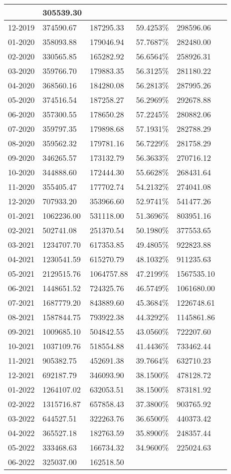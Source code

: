 \documentclass{report}
\begin{document}
\begin{longtable}[c]{|p{1.7cm}|p{2.6cm}|p{2.6cm}|p{2.3cm}|p{2.3cm}|c|}
& 305539.30\\ \hline12-2019 & 374590.67 & 187295.33 & 59.4253\% & 298596.06\\ \hline01-2020 & 358093.88 & 179046.94 & 57.7687\% & 282480.00\\ \hline02-2020 & 330565.85 & 165282.92 & 56.6564\% & 258926.31\\ \hline03-2020 & 359766.70 & 179883.35 & 56.3125\% & 281180.22\\ \hline04-2020 & 368560.16 & 184280.08 & 56.2813\% & 287995.26\\ \hline05-2020 & 374516.54 & 187258.27 & 56.2969\% & 292678.88\\ \hline06-2020 & 357300.55 & 178650.28 & 57.2245\% & 280882.06\\ \hline07-2020 & 359797.35 & 179898.68 & 57.1931\% & 282788.29\\ \hline08-2020 & 359562.32 & 179781.16 & 56.7229\% & 281758.29\\ \hline09-2020 & 346265.57 & 173132.79 & 56.3633\% & 270716.12\\ \hline10-2020 & 344888.60 & 172444.30 & 55.6628\% & 268431.64\\ \hline11-2020 & 355405.47 & 177702.74 & 54.2132\% & 274041.08\\ \hline12-2020 & 707933.20 & 353966.60 & 52.9741\% & 541477.26\\ \hline01-2021 & 1062236.00 & 531118.00 & 51.3696\% & 803951.16\\ \hline02-2021 & 502741.08 & 251370.54 & 50.1980\% & 377553.65\\ \hline03-2021 & 1234707.70 & 617353.85 & 49.4805\% & 922823.88\\ \hline04-2021 & 1230541.59 & 615270.79 & 48.1032\% & 911235.63\\ \hline05-2021 & 2129515.76 & 1064757.88 & 47.2199\% & 1567535.10\\ \hline06-2021 & 1448651.52 & 724325.76 & 46.5749\% & 1061680.00\\ \hline07-2021 & 1687779.20 & 843889.60 & 45.3684\% & 1226748.61\\ \hline08-2021 & 1587844.75 & 793922.38 & 44.3292\% & 1145861.86\\ \hline09-2021 & 1009685.10 & 504842.55 & 43.0560\% & 722207.60\\ \hline10-2021 & 1037109.76 & 518554.88 & 41.4436\% & 733462.44\\ \hline11-2021 & 905382.75 & 452691.38 & 39.7664\% & 632710.23\\ \hline12-2021 & 692187.79 & 346093.90 & 38.1500\% & 478128.72\\ \hline01-2022 & 1264107.02 & 632053.51 & 38.1500\% & 873181.92\\ \hline02-2022 & 1315716.87 & 657858.43 & 37.3800\% & 903765.92\\ \hline03-2022 & 644527.51 & 322263.76 & 36.6500\% & 440373.42\\ \hline04-2022 & 365527.18 & 182763.59 & 35.8900\% & 248357.44\\ \hline05-2022 & 333468.63 & 166734.32 & 34.9600\% & 225024.63\\ \hline06-2022 & 325037.00 & 162518.50 & 
\end{longtable}
\end{document}
